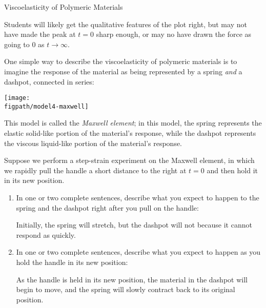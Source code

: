 \begin{activity}{Viscoelasticity of Polymeric Materials}
\begin{ctqs}
\begin{enumerate}
				\begin{solution}[1in]
					Students will likely get the qualitative features of the plot right, but may not have made the peak at $t=0$ sharp enough, or may no have drawn the force as going to $0$ as $t\to\infty$.
				\end{solution}
		\end{enumerate}
\end{ctqs}
	
\clearpage
\begin{model}
\label{\labelbase:mdl:maxwell}

	One simple way to describe the viscoelasticity of polymeric materials is to imagine the response of the material as being represented by a spring \emph{and} a dashpot, connected in series:
	
	\vspace{3pt}
	\centerline{\texttt{[image: \\figpath/model4-maxwell]}}
	
	This model is called the \emph{Maxwell element}; in this model, the spring represents the elastic solid-like portion of the material's response, while the dashpot represents the viscous liquid-like portion of the material's response.
	
\end{model}

	
\begin{ctqs}
	\question Suppose we perform a step-strain experiment on the Maxwell element, in which we rapidly pull the handle a short distance to the right at $t=0$ and then hold it in its new position.
	
		\begin{enumerate}
			\item In one or two complete sentences, describe what you expect to happen to the spring and the dashpot right after you pull on the handle:
			
				\begin{solution}[1.75in]
					Initially, the spring will stretch, but the dashpot will not because it cannot respond as quickly.
				\end{solution}
			
			\item In one or two complete sentences, describe what you expect to happen as you hold the handle in its new position:
			
				\begin{solution}[1.75in]
					As the handle is held in its new position, the material in the dashpot will begin to move, and the spring will slowly contract back to its original position.
				\end{solution}
			

\end{enumerate}
\end{ctqs}
\end{activity}
